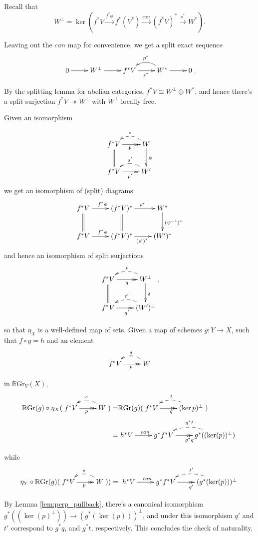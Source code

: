 \documentclass[edeposit,fullpage]{uiucthesis2009}
\newcommand{\RGr}{\mathbb R\mathrm{Gr}}
\theoremstyle{plain}
\numberwithin{lemma}{section}
\theoremstyle{definition}
\begin{document}
Recall that 
\[
W^\perp = \ker(f^*V \xrightarrow{f^*\phi} f^*(V^*) \xrightarrow{can}
(f^*V)^* \xrightarrow{s^*} W^*).
\]



Leaving out the $can$ map for convenience, we get a split exact sequence 
\[
\xymatrix{0 \ar[r] & W^\perp \ar[r] & f^*V \ar[r]_{s^*}& \ar@/_1.0pc/[l]_{p^*} W^*
\ar[r] & 0}.
\]

By the splitting lemma for abelian categories, $f^*V \cong W^\perp
\oplus W^*$, and hence there's a split surjection $f^*V
\twoheadrightarrow W^\perp$ with $W^\perp$ locally free. 

Given an isomorphism 

\[
\xymatrix{f^*V \ar@{>>}[r]_p \ar@{=}[d]& \ar@/_1.0pc/@{-->}[l]_sW \ar[d]^\psi\\
f^*V \ar@{>>}[r]_{p'} & \ar@/_1.0pc/@{-->}[l]_{s'}W'}
\]
we get an isomorphism of (split) diagrams
\[
\xymatrix{f^*V \ar[r]^{f^*\phi}\ar@{=}[d] &(f^*V)^*\ar[r]^{s^*} \ar@{=}[d] & W^* \ar[d]^{(\psi^{-1})^*}\\
f^*V \ar[r]^{f^*\phi} & (f^*V)^* \ar[r]_{(s')^* }& (W')^*}
\]
and hence an isomorphism of split surjections
\[
\xymatrix{f^*V \ar@{>>}[r]_q \ar@{=}[d]& \ar@/_1.0pc/@{-->}[l]_tW^\perp \ar[d]^\delta\\
f^*V \ar@{>>}[r]_{q'} & \ar@/_1.0pc/@{-->}[l]_{t'}(W')^\perp},
\]

so that $\eta_X$ is a well-defined map of sets. Given a map of schemes
$g : Y \rightarrow X$, such that $f\circ g = h$ and an element 
\[
\xymatrix{f^*V \ar@{>>}[r]_p & \ar@/_1.0pc/@{-->}[l]_sW}
\]

in $\RGr_V(X)$, 
\begin{align*}
\RGr(g) \circ \eta_X(\xymatrix{f^*V \ar@{>>}[r]_p &
  \ar@/_1.0pc/@{-->}[l]_sW}) = & \RGr(g)( \xymatrix{f^*V \ar@{>>}[r]_q
  & \ar@/_1.0pc/@{-->}[l]_t(\ker p)^\perp})\\
 = & \xymatrix{h^*V \ar[r]^{can} & g^*f^*V \ar@{>>}[r]_{g^*q} &
  \ar@/_1.0pc/@{-->}[l]_{g^*t} g^*((\ker(p))^\perp)}
\end{align*}

while
\begin{align*}
\eta_Y\circ\RGr(g)(\xymatrix{f^*V \ar@{>>}[r]_p &
  \ar@/_1.0pc/@{-->}[l]_sW})) = \xymatrix{h^*V \ar[r]^{can} & g^*f^*V \ar@{>>}[r]_{q'} &
  \ar@/_1.0pc/@{-->}[l]_{t'} (g^*(\ker(p)))^\perp}
\end{align*}

By Lemma \ref{lem:perp_pullback}, there's a canonical isomorphism
$g^*((\ker(p)^\perp)) \rightarrow (g^*(\ker(p)))^\perp$, and under
this isomorphism $q'$ and $t'$ correspond to $g^*q$, and $g^*t$,
respectively. This concludes the check of naturality.
\end{document}
